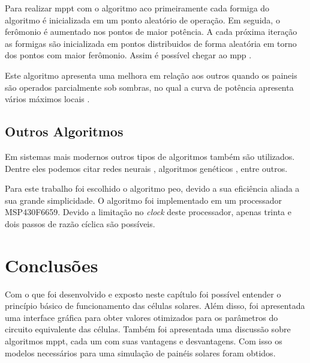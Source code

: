 Para realizar \gls{mppt} com o algoritmo \gls{aco} primeiramente cada formiga do algoritmo é inicializada em um ponto aleatório de operação. Em seguida, o ferômonio é aumentado nos pontos de maior potência. A cada próxima iteração as formigas são inicializada em pontos distribuidos de forma aleatória em torno dos pontos com maior ferômonio. Assim é possível chegar ao \gls{mpp} \cite{jiang2013}.

Este algoritmo apresenta uma melhora em relação aos outros quando os paineis são operados parcialmente sob sombras, no qual a curva de potência apresenta vários máximos locais \cite{jiang2013}.

\subsection{Outros Algoritmos}

Em sistemas mais modernos outros tipos de algoritmos também são utilizados. Dentre eles podemos citar redes neurais \cite{elobaid2012}, algoritmos genéticos \cite{daraban2013}, entre outros.

Para este trabalho foi escolhido o algoritmo \gls{peo}, devido a sua eficiência aliada a sua grande simplicidade. O algoritmo foi implementado em um processador MSP430F6659. Devido a limitação no \textit{clock} deste processador, apenas trinta e dois passos de razão cíclica são possíveis.

\section{Conclusões}

Com o que foi desenvolvido e exposto neste capítulo foi possível entender o princípio básico de funcionamento das células solares. Além disso, foi apresentada uma interface gráfica para obter valores otimizados para os parâmetros do circuito equivalente das células. Também foi apresentada uma discussão sobre algoritmos \gls{mppt}, cada um com suas vantagens e desvantagens. Com isso os modelos necessários para uma simulação de painéis solares foram obtidos.